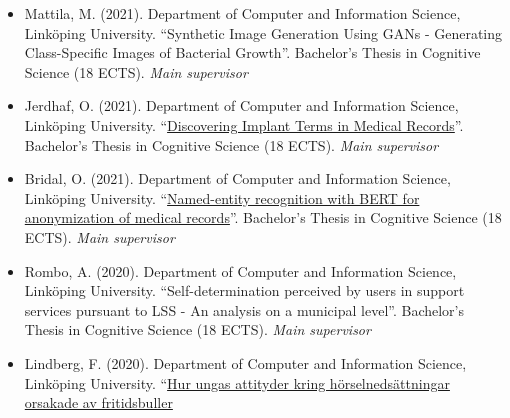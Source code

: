 \documentclass[]{article}
\begin{document}
\begin{itemize}
  Bernsland, A. (2023). Department of Computer and Information Science,
  Linköping University. ``\,`Disgusting pictures' - A study exploring
  webpages' experienced credibility based upon their visual design
  elements''. Bachelor's Thesis in Cognitive Science (18 ECTS).
  \emph{Main supervisor}
\item
  Mattila, M. (2021). Department of Computer and Information Science,
  Linköping University. ``Synthetic Image Generation Using GANs -
  Generating Class-Specific Images of Bacterial Growth''. Bachelor's
  Thesis in Cognitive Science (18 ECTS). \emph{Main supervisor}
\item
  Jerdhaf, O. (2021). Department of Computer and Information Science,
  Linköping University.
  ``\href{http://liu.diva-portal.org/smash/record.jsf?dswid=-6296&pid=diva2\%3A1621364&c=1&searchType=SIMPLE&language=sv&query=Jerdhaf&af=\%5B\%5D&aq=\%5B\%5B\%5D\%5D&aq2=\%5B\%5B\%5D\%5D&aqe=\%5B\%5D&noOfRows=50&sortOrder=author_sort_asc&sortOrder2=title_sort_asc&onlyFullText=false&sf=undergraduate}{Discovering
  Implant Terms in Medical Records}''. Bachelor's Thesis in Cognitive
  Science (18 ECTS). \emph{Main supervisor}
\item
  Bridal, O. (2021). Department of Computer and Information Science,
  Linköping University.
  ``\href{http://liu.diva-portal.org/smash/record.jsf?dswid=-6296&faces-redirect=true&language=en&searchType=SIMPLE&query=Marsja&af=\%5B\%5D&aq=\%5B\%5B\%5D\%5D&aq2=\%5B\%5B\%5D\%5D&aqe=\%5B\%5D&pid=diva2\%3A1566701&noOfRows=50&sortOrder=author_sort_asc&sortOrder2=title_sort_asc&onlyFullText=false&sf=undergraduate}{Named-entity
  recognition with BERT for anonymization of medical records}''.
  Bachelor's Thesis in Cognitive Science (18 ECTS). \emph{Main
  supervisor}
\item
  Rombo, A. (2020). Department of Computer and Information Science,
  Linköping University. ``Self-determination perceived by users in
  support services pursuant to LSS - An analysis on a municipal level''.
  Bachelor's Thesis in Cognitive Science (18 ECTS). \emph{Main
  supervisor}
\item
  Lindberg, F. (2020). Department of Computer and Information Science,
  Linköping University.
  ``\href{http://liu.diva-portal.org/smash/record.jsf?dswid=-6296&faces-redirect=true&language=en&searchType=SIMPLE&query=Marsja&af=\%5B\%5D&aq=\%5B\%5B\%5D\%5D&aq2=\%5B\%5B\%5D\%5D&aqe=\%5B\%5D&pid=diva2\%3A1468019&noOfRows=50&sortOrder=author_sort_asc&sortOrder2=title_sort_asc&onlyFullText=false&sf=undergraduate}{Hur
  ungas attityder kring hörselnedsättningar orsakade av fritidsbuller
}
\end{itemize}
\end{document}
